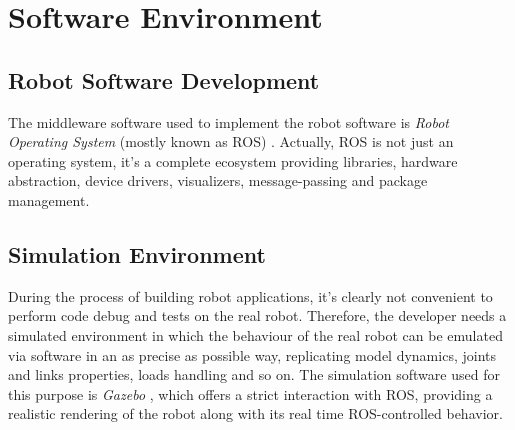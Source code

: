 \section{Software Environment}
\subsection{Robot Software Development}
The middleware software used to implement the robot software is \textit{Robot Operating System} (mostly known as ROS) \cite{webros}. Actually, ROS is not just an operating system, it's a complete ecosystem providing libraries, hardware abstraction, device drivers, visualizers, message-passing and package management. 






\subsection{Simulation Environment}
During the process of building robot applications, it's clearly not convenient to perform code debug and tests on the real robot. Therefore, the developer needs a simulated environment in which the behaviour of the real robot can be emulated via software in an as precise as possible way, replicating model dynamics, joints and links properties, loads handling and so on. The simulation software used for this purpose is \textit{Gazebo} \cite{webgazebo}, which offers a strict interaction with ROS, providing a realistic rendering of the robot along with its real time ROS-controlled behavior. 

